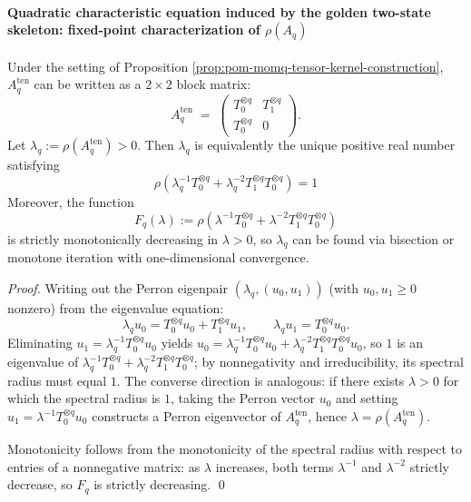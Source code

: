 \paragraph{Quadratic characteristic equation induced by the golden two-state skeleton: fixed-point characterization of \texorpdfstring{$\rho(A_q)$}{rho(Aq)}}
\begin{proposition}\label{prop:pom-golden-grammar-fixed-point-rho-aq}
Under the setting of Proposition \ref{prop:pom-momq-tensor-kernel-construction}, \(A_q^{\mathrm{ten}}\) can be written as a \(2\times 2\) block matrix:
\[
A_q^{\mathrm{ten}}
\;=\;
\begin{pmatrix}
T_0^{\otimes q} & T_1^{\otimes q}\\[2pt]
T_0^{\otimes q} & 0
\end{pmatrix}.
\]
Let \(\lambda_q:=\rho(A_q^{\mathrm{ten}})>0\).
Then \(\lambda_q\) is equivalently the unique positive real number satisfying
\[
\boxed{\;
\rho\!\left(\lambda_q^{-1}T_0^{\otimes q}+\lambda_q^{-2}T_1^{\otimes q}T_0^{\otimes q}\right)=1\; }
\]
Moreover, the function
\[
F_q(\lambda):=\rho\!\left(\lambda^{-1}T_0^{\otimes q}+\lambda^{-2}T_1^{\otimes q}T_0^{\otimes q}\right)
\]
is strictly monotonically decreasing in \(\lambda>0\), so \(\lambda_q\) can be found via bisection or monotone iteration with one-dimensional convergence.
\end{proposition}
\begin{proof}
Writing out the Perron eigenpair \((\lambda_q,(u_0,u_1))\) (with \(u_0,u_1\ge 0\) nonzero) from the eigenvalue equation:
\[
\lambda_q u_0=T_0^{\otimes q}u_0+T_1^{\otimes q}u_1,
\qquad
\lambda_q u_1=T_0^{\otimes q}u_0.
\]
Eliminating \(u_1=\lambda_q^{-1}T_0^{\otimes q}u_0\) yields
\(
u_0=\lambda_q^{-1}T_0^{\otimes q}u_0+\lambda_q^{-2}T_1^{\otimes q}T_0^{\otimes q}u_0
\),
so \(1\) is an eigenvalue of \(\lambda_q^{-1}T_0^{\otimes q}+\lambda_q^{-2}T_1^{\otimes q}T_0^{\otimes q}\); by non\-negativity and irreducibility, its spectral radius must equal \(1\).
The converse direction is analogous: if there exists \(\lambda>0\) for which the spectral radius is \(1\), taking the Perron vector \(u_0\) and setting \(u_1=\lambda^{-1}T_0^{\otimes q}u_0\) constructs a Perron eigenvector of \(A_q^{\mathrm{ten}}\), hence \(\lambda=\rho(A_q^{\mathrm{ten}})\).
\par
Monotonicity follows from the monotonicity of the spectral radius with respect to entries of a nonneg\-ative matrix: as \(\lambda\) increases, both terms \(\lambda^{-1}\) and \(\lambda^{-2}\) strictly decrease, so \(F_q\) is strictly decreasing. \qed
\end{proof}
